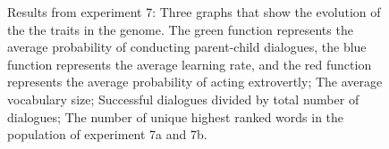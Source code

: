 \begin{figure}
    \centering
    \ContinuedFloat
    \hfill
    \par \bigskip
    \hfill
    \caption{Results from experiment 7:  Three graphs that show the evolution of the the traits in the genome. The green function represents the average probability of conducting parent-child dialogues, the blue function represents the average learning rate, and the red function represents the average probability of acting extrovertly;  The average vocabulary size;  Successful dialogues divided by total number of dialogues;  The number of unique highest ranked words in the population of experiment 7a and 7b.}
    \label{fig:exp7.1}
\end{figure}

